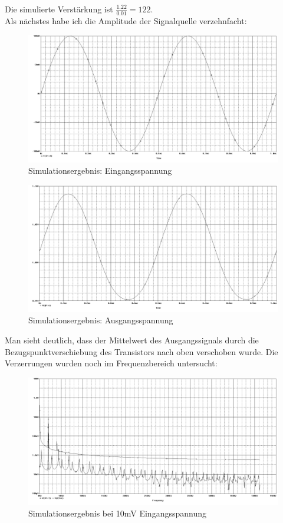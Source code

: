 Die simulierte Verstärkung ist $\frac{1.22}{0.01}=122$.\\
Als nächstes habe ich die Amplitude der Signalquelle verzehnfacht:
\begin{figure}[H]
	\centering
	\includegraphics[width=\linewidth]{versuch5/spice/5312e.png}
	\caption{Simulationsergebnis: Eingangsspannung}
\end{figure}
\begin{figure}[H]
	\centering
	\includegraphics[width=\linewidth]{versuch5/spice/5312a.png}
	\caption{Simulationsergebnis: Ausgangsspannung}
\end{figure}
Man sieht deutlich, dass der Mittelwert des Ausgangssignals durch die Bezugspunktverschiebung des Transistors nach oben verschoben wurde. Die Verzerrungen wurden noch im Frequenzbereich untersucht:
\begin{figure}[H]
	\centering
	\includegraphics[width=\linewidth]{versuch5/spice/5313f1.png}
	\caption{Simulationsergebnis bei 10mV Eingangsspannung}
\end{figure}
